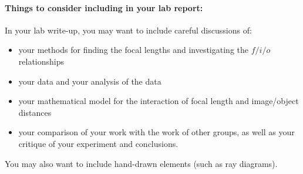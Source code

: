 \paragraph*{Things to consider including in your lab report:} In your lab write-up, you may want to include careful discussions of:
\begin{itemize}
\itemsep-0.3em
\item your methods for finding the focal lengths and investigating the $f/i/o$ relationships
\item your data and your analysis of the data
\item your mathematical model for the interaction of focal length and image/object distances
\item your comparison of your work with the work of other groups, as well as your critique of your experiment and conclusions. 
\end{itemize}
You may also want to include hand-drawn elements (such as ray diagrams).